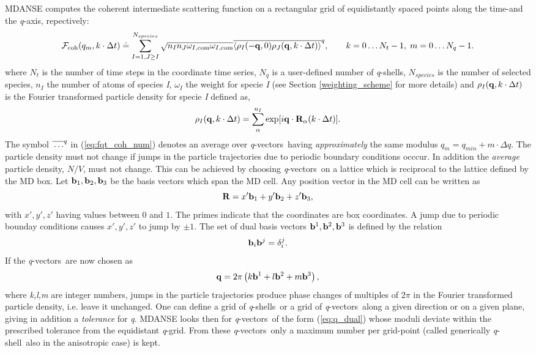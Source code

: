 \documentclass[a4paper,11pt]{article}
\newcommand{\qval}{\textit{q}}
\newcommand{\qvects}{\textit{q}-vectors}
\newcommand{\qshell}{\textit{q}-shell}
\newcommand{\qshells}{\textit{q}-shells}
\begin{document}
\gls{MDANSE} computes the coherent intermediate scattering function on a rectangular grid of equidistantly spaced points along
the time-and the \qval-axis, repectively:
\begin{equation}
\label{eq:fqt_coh_num}
{\cal F}_{\mathrm{coh}}(q_m,k\cdot\Delta t) \doteq \sum\limits^{N_{species}}_{I=1,J\geq I} \sqrt{n_I n_J \omega_{I,\mathrm{com}}\omega_{I,\mathrm{com}}}
\overline{\langle \rho_I(-{\bf q},0)\rho_J({\bf q},k\cdot\Delta t) \rangle}^{q},
\qquad k = 0\ldots N_t - 1,\; m = 0\ldots N_q - 1.
\end{equation}
where $N_t$ is the number of time steps in the coordinate time series, $N_q$ is a user-defined number of \qshells,
$N_{species}$ is the number of selected species, $n_I$ the number of atoms of species \textit{I}, $\omega_I$ the weight for specie
\textit{I} (see Section \ref{weighting_scheme} for more details) and $\rho_I({\bf q},k\cdot\Delta t)$ is the Fourier transformed particle
density for specie \textit{I} defined as,
\begin{equation}
\label{eq:dcsf_rho}
\rho_I({\bf q},k\cdot\Delta t) = \sum\limits_\alpha^{n_I} \exp[i{\bf q}\cdot{\bf R}_\alpha(k\cdot\Delta t)].
\end{equation}
The symbol $\overline{\rule{0pt}{5pt}\ldots}^{q}$ in (\ref{eq:fqt_coh_num}) denotes an average over \qvects\ having
{\em approximately} the same modulus $q_m = q_{min} + m\cdot\Delta q$. The particle density must not change if jumps in
the particle trajectories due to periodic boundary conditions occcur. In addition the {\em average} particle density,
$N/V$, must not change. This can be achieved by choosing \qvects\ on a lattice which is reciprocal to the lattice defined
by the \gls{MD} box. Let ${\bf b}_1,{\bf b}_2,{\bf b}_3$ be the basis vectors which span the \gls{MD} cell. Any position vector in the
\gls{MD} cell can be written as
\begin{equation}
{\bf R} = x'{\bf b}_1 + y'{\bf b}_2 + z'{\bf b}_3,
\end{equation}
with $x',y',z'$ having values between $0$ and $1$.  The primes indicate that the coordinates are box coordinates. A jump due
to periodic bounday conditions causes $x',y',z'$ to jump by $\pm 1$.  The set of dual basis vectors ${\bf b}^1,{\bf b}^2,{\bf b}^3$
is defined by the relation
\begin{equation}
{\bf b}_i{\bf b}^j = \delta_i^j.
\end{equation}
If the \qvects\ are now chosen as
\begin{equation}
\label{eq:q_dual}
{\bf q} = 2\pi\left(k{\bf b}^1 + l{\bf b}^2 + m{\bf b}^3\right),
\end{equation}
where \textit{k,l,m} are integer numbers, jumps in the particle trajectories produce phase changes of multiples of $2\pi$ in the
Fourier transformed particle density, i.e. leave it unchanged. One can define a grid of \qshells\ or a grid of \qvects\
along a given direction or on a given plane, giving in addition a {\em tolerance} for \qval. \gls{MDANSE} looks then for
\qvects\ of the form (\ref{eq:q_dual}) whose moduli deviate within the prescribed tolerance from the equidistant \qval-grid.
From these \qvects\ only a maximum number per grid-point (called generically \qshell\ also in the anisotropic case) is
kept.
\end{document}
